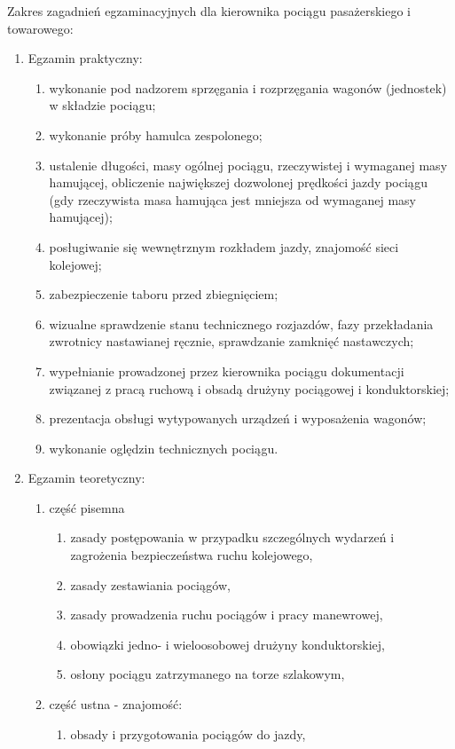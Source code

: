 \documentclass[usenames,dvipsnames,svgnames,table,a4paper,openany,justified]{kaobook}
\begin{document}
Zakres zagadnień egzaminacyjnych dla kierownika pociągu pasażerskiego i towarowego:
 \begin{enumerate}
 	\item Egzamin praktyczny:
 	\begin{enumerate}
 		\item wykonanie pod nadzorem sprzęgania i rozprzęgania wagonów (jednostek) w składzie
 		pociągu;
 		\item wykonanie próby hamulca zespolonego;
 		\item ustalenie długości, masy ogólnej pociągu, rzeczywistej i wymaganej masy hamującej, obliczenie największej dozwolonej prędkości jazdy pociągu (gdy rzeczywista masa hamująca jest mniejsza od wymaganej masy hamującej);
 		\item posługiwanie się wewnętrznym rozkładem jazdy, znajomość sieci kolejowej;
 		\item zabezpieczenie taboru przed zbiegnięciem;
 		\item wizualne sprawdzenie stanu technicznego rozjazdów, fazy przekładania zwrotnicy nastawianej ręcznie, sprawdzanie zamknięć nastawczych;
 		\item wypełnianie prowadzonej przez kierownika pociągu dokumentacji związanej z pracą ruchową i obsadą drużyny pociągowej i konduktorskiej;
 		\item prezentacja obsługi wytypowanych urządzeń i wyposażenia wagonów;
 		\item wykonanie oględzin technicznych pociągu.
 	\end{enumerate}
 	\item Egzamin teoretyczny:
 	\begin{enumerate}
 		\item część pisemna
 		\begin{enumerate}
 			\item zasady postępowania w przypadku szczególnych wydarzeń i zagrożenia bezpieczeństwa ruchu kolejowego,
 			\item zasady zestawiania pociągów,
 			\item zasady prowadzenia ruchu pociągów i pracy manewrowej,
 			\item obowiązki jedno- i wieloosobowej drużyny konduktorskiej,
 			\item osłony pociągu zatrzymanego na torze szlakowym,
 		\end{enumerate}
 		\item część ustna - znajomość:
 		\begin{enumerate}
 			\item obsady i przygotowania pociągów do jazdy,

\end{enumerate}
\end{enumerate}
\end{enumerate}
\end{document}
